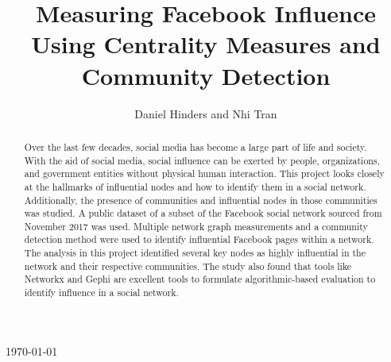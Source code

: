 \documentclass[11pt,twocolumn]{article}
\begin{document}
\begin{titlepage}
    
    
    \vfill\vfill\vfill %
    
    {\large\today} %
    
    
     
    
    \vfill %
    
\end{titlepage}

\title{Measuring Facebook Influence Using Centrality Measures and Community Detection}
\author{Daniel Hinders and Nhi Tran}
\maketitle
\begin{abstract}
Over the last few decades, social media has become a large part of life and society. With the aid of social media, social influence can be exerted by people, organizations, and government entities without physical human interaction. This project looks closely at the hallmarks of influential nodes and how to identify them in a social network. Additionally, the presence of communities and influential nodes in those communities was studied.  A public dataset of a subset of the Facebook social network sourced from November 2017 was used. Multiple network graph measurements and a community detection method were used to identify influential Facebook pages within a network. The analysis in this project identified several key nodes as highly influential in the network and their respective communities. The study also found that tools like Networkx and Gephi are excellent tools to formulate algorithmic-based evaluation to identify influence in a social network.\end{abstract}
\end{document}
